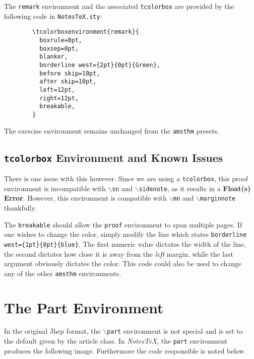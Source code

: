 \documentclass[10pt]{article}
\begin{document}
	\begin{remark}
		The \texttt{remark} environment and the associated \texttt{tcolorbox} are provided by the following code in \texttt{NotesTeX.sty}:
		\begin{verbatim}
		\tcolorboxenvironment{remark}{
		  boxrule=0pt,
		  boxsep=0pt,
		  blanker,
		  borderline west={2pt}{0pt}{Green},
		  before skip=10pt,
		  after skip=10pt,
		  left=12pt,
		  right=12pt,
		  breakable,
		}
		\end{verbatim}
	\end{remark}
	\begin{exercise}
		The exercise environment remains unchanged from the \texttt{amsthm} presets.
	\end{exercise}



	\subsection{\texttt{tcolorbox} Environment and Known Issues} %
	\label{ssub:tcolorbox environments_and_known_issues}
	
	There is one issue with this however. Since we are using a \texttt{tcolorbox}, this proof environment is incompatible with \texttt{$\backslash$sn} and \texttt{$\backslash$sidenote}, as it results in a \textbf{Float(s) Error}. However, this environment is compatible with \texttt{$\backslash$mn} and \texttt{$\backslash$marginnote} thankfully.


	The \texttt{breakable} should allow the \texttt{proof} environment to span multiple pages. If one wishes to change the color, simply modify the line which states \texttt{borderline west=\{1pt\}\{0pt\}\{blue\}}. The first numeric value dictates the width of the line, the second dictates how close it is away from the \textit{left} margin, while the last argument obviously dictates the color. This code could also be used to change any of the other \texttt{amsthm} environments.


	\section{The Part Environment}\label{sec:part}
	In the original Jhep format, the \texttt{$\backslash$part} environment is not special and is set to the default given by the article class. In \textit{NotesTeX}, the \texttt{part} environment produces the following image. Furthermore the code responsible is noted below.\\
\end{document}
